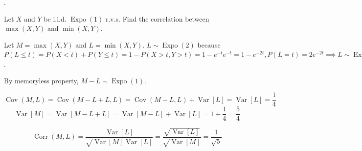 \documentclass[8pt]{beamer}
\newcommand{\Expo}[1]{\operatorname{Expo}\!\left(#1\right)}
\newcommand{\Var}[1]{\operatorname{Var}\left[#1\right]}
\newcommand{\Cov}[2]{\operatorname{Cov}\!\left(#1, #2\right)}
\newcommand{\Corr}[2]{\operatorname{Corr}\!\left(#1, #2\right)}
\begin{document}
\begin{frame}{.}
    \begin{example}
        Let $X$ and $Y$ be i.i.d. $\Expo{1}$ r.v.s. Find the correlation between $\max{(X,Y)}$ and $\min{(X,Y)}$.
    \end{example}

    Let $M = \max{(X,Y)}$ and $L = \min{(X,Y)}$. $L \sim \Expo{2}$ because $P(L \leq t) = P(X < t) + P(Y\leq t) = 1 - P(X>t, Y>t) = 1 - e^{-t} e^{-t} = 1- e^{-2t}, P(L = t) = 2e^{-2t}\implies L \sim \Expo{2}$.

    By memoryless property, $M-L \sim \Expo{1}$.

    \[
        \Cov{M}{L} = \Cov{M-L + L}{L} = \Cov{M-L}{L} + \Var{L} = \Var{L} =\frac{1}{4}
    \]
    \[
        \Var{M} = \Var{M-L+L} = \Var{M-L} + \Var{L} = 1+ \frac{1}{4} = \frac{5}{4}
    \]

    \[
        \Corr{M}{L} = \frac{\Var{L}}{\sqrt{\Var{M}}\Var{L}} = \frac{\sqrt{\Var{L}}}{\sqrt{\Var{M}}} = \frac{1}{\sqrt{5}}
    \]

\end{frame}
\end{document}
